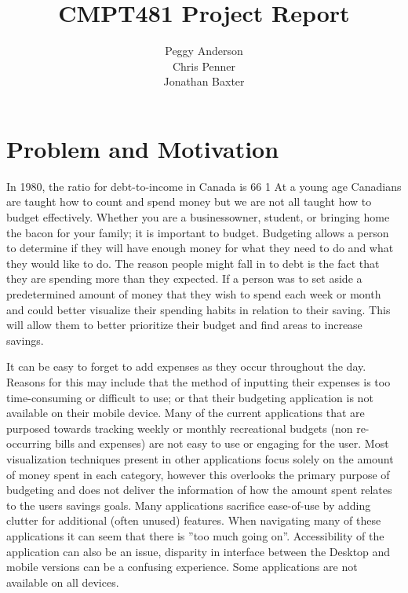 \documentclass{chi2011}
\begin{document}
\setlength{\paperheight}{11in}
\setlength{\paperwidth}{8.5in}
\setlength{\pdfpageheight}{\paperheight}
\setlength{\pdfpagewidth}{\paperwidth}


\title{CMPT481 Project Report}
\author{
\alignauthor Peggy Anderson\\
    \alignauthor Chris Penner\\
    \alignauthor Jonathan Baxter\\
}

\maketitle

\section{Problem and Motivation}

In 1980, the ratio for debt-to-income in Canada is 66%
1 At a young age Canadians are taught how to count and spend money but we are not all taught how to
budget effectively. Whether you are a businessowner, student, or bringing home the bacon for your
family; it is important to budget. Budgeting allows a person to determine if they will have enough
money for what they need to do and what they would like to do. The reason people might fall in to
debt is the fact that they are spending more than they expected. If a person was to set aside a
predetermined amount of money that they wish to spend each week or month and could better visualize
their spending habits in relation to their saving. This will allow them to better prioritize their
budget and find areas to increase savings.

It can be easy to forget to add expenses as they occur throughout the day. Reasons for this may
include that the method of inputting their expenses is too time-consuming or difficult to use; or
that their budgeting application is not available on their mobile device. Many of the current
applications that are purposed towards tracking weekly or monthly recreational budgets (non
re-occurring bills and expenses) are not easy to use or engaging for the user. Most visualization
techniques present in other applications focus solely on the amount of money spent in each
category, however this overlooks the primary purpose of budgeting and does not deliver the
information of how the amount spent relates to the users savings goals. Many applications sacrifice
ease-of-use by adding clutter for additional (often unused) features. When navigating many of these
applications it can seem that there is ”too much going on”. Accessibility of the application can
also be an issue, disparity in interface between the Desktop and mobile versions can be a confusing
experience. Some applications are not available on all devices.
\end{document}

